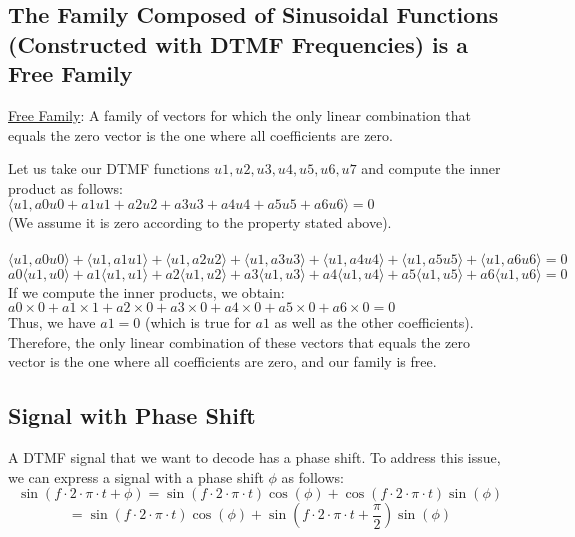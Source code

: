 \subsection{The Family Composed of Sinusoidal Functions (Constructed with DTMF Frequencies) is a Free Family}
\underline{Free Family}: A family of vectors for which the only linear combination that equals the zero vector is the one where all coefficients are zero.

Let us take our DTMF functions \( u1, u2, u3, u4, u5, u6, u7 \) and compute the inner product as follows:
\\
\( \langle u1, a0u0 + a1u1 + a2u2 + a3u3 + a4u4 + a5u5 + a6u6 \rangle = 0 \)
\\
(We assume it is zero according to the property stated above).\\~\\
\( \langle u1, a0u0 \rangle + \langle u1, a1u1 \rangle + \langle u1, a2u2 \rangle + \langle u1, a3u3 \rangle + \langle u1, a4u4 \rangle + \langle u1, a5u5 \rangle + \langle u1, a6u6 \rangle = 0 \)
\\
\( a0 \langle u1, u0 \rangle + a1 \langle u1, u1 \rangle + a2 \langle u1, u2 \rangle + a3 \langle u1, u3 \rangle + a4 \langle u1, u4 \rangle + a5 \langle u1, u5 \rangle + a6 \langle u1, u6 \rangle = 0 \)
\\
If we compute the inner products, we obtain:
\\
\( a0 \times 0 + a1 \times 1 + a2 \times 0 + a3 \times 0 + a4 \times 0 + a5 \times 0 + a6 \times 0 = 0 \)
\\
Thus, we have \( a1 = 0 \) (which is true for \( a1 \) as well as the other coefficients).
\\
Therefore, the only linear combination of these vectors that equals the zero vector is the one where all coefficients are zero, and our family is free.

\subsection{Signal with Phase Shift}

A DTMF signal that we want to decode has a phase shift.
To address this issue, we can express a signal with a phase shift \( \phi \) as follows:
$$\sin(f \cdot 2 \cdot \pi \cdot t + \phi) = \sin(f \cdot 2 \cdot \pi \cdot t) \cos(\phi) + \cos(f \cdot 2 \cdot \pi \cdot t) \sin(\phi)$$
$$= \sin(f \cdot 2 \cdot \pi \cdot t) \cos(\phi) + \sin(f \cdot 2 \cdot \pi \cdot t + \frac{\pi}{2}) \sin(\phi)$$

